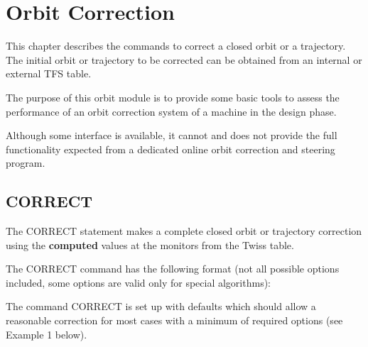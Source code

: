 
\chapter{Orbit Correction}  

This chapter describes the commands to correct a closed orbit or a
trajectory. The initial orbit or trajectory to be corrected can be
obtained  from an internal or external TFS table.   

The purpose of this orbit module is to provide some basic tools to
assess the performance of an orbit correction system of a machine in the
design phase.  

Although some interface is available, it cannot and does not provide the
full functionality expected from a dedicated online orbit correction and
steering program.  

%
\section{CORRECT}  
\label{sec:correct}

The CORRECT statement makes a complete closed orbit  or trajectory
correction using the \textbf{computed} values at the monitors  from the
Twiss table.   

The CORRECT command has the following format (not all possible options
included, some options are valid only for special algorithms):  


The command CORRECT is set up with defaults which should allow a
reasonable correction for most cases with a minimum of required options
(see Example 1 below).  

